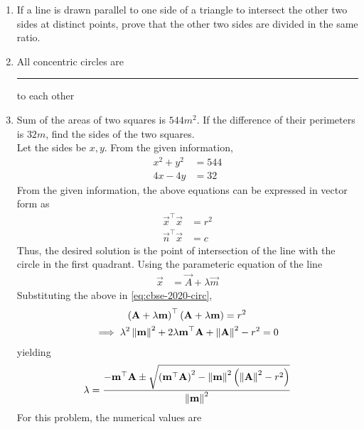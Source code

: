 \documentclass[journal,12pt,twocolumn]{IEEEtran}
\begin{document}
\begin{enumerate}
\begin{figure}[h!]
    	\caption{}
    	\label{Fig6}
     \end{figure}
    \item If a line is drawn parallel to one side of a triangle to intersect the other two sides at distinct points, prove that the other two sides are divided in the same ratio.\\
\item All concentric circles are \rule{1.5cm}{0.15mm} to each other\\
        \item Sum of the areas of two squares is $544 m^2$. If the difference of their perimeters is $32m$, find the sides of the two squares.\\
		\solution Let the sides be $x, y$.  From the given information, 
		    \begin{align}
			    x^2 +y^2 &= 544
			    \\
			    4x - 4y &= 32
		    \end{align}
		    From the given information, the above equations can be expressed in vector form as 
		    \begin{align}
			    \label{eq:cbse-2020-circ}
			    \vec{x}^{\top}\vec{x} &= r^2
			    \\
			    \vec{n}^{\top}\vec{x} &= c
		    \end{align}
		    Thus, the desired solution is the point of intersection of the line with the circle in the first quadrant.  Using the parameteric equation of the line 
		    \begin{align}
			    \label{eq:cbse-2020-circ-line-param}
			    \vec{x} &= \vec{A} + \lambda \vec{m}
		    \end{align}
			    Substituting the above in \eqref{eq:cbse-2020-circ}, 
		    \begin{multline}
			    \left( \mathbf{A} + \lambda \mathbf{m}\right)^{\top}
			    \left( \mathbf{A} + \lambda \mathbf{m}\right)
			    = r^2
			    \\
			    \implies \lambda^2\left\lVert\mathbf{m}\right\rVert^2+ 2 \lambda \mathbf{m}^{\top}\mathbf{A}
			    +\left\lVert\mathbf{A}\right\rVert^2 - r^2 = 0
		    \end{multline}
		    yielding 
		    {\small
		    \begin{align}
			    \label{eq:cbse-2020-circ_lam}
		\lambda = \frac{-\mathbf{m}^{\top}\mathbf{A}\pm \sqrt{\left(\mathbf{m}^{\top}\mathbf{A}\right)^2 -\left\lVert\mathbf{m}\right\rVert^2\left(\left\lVert\mathbf{A}\right\rVert^2 - r^2 \right)}}{\left\lVert\mathbf{m}\right\rVert^2}
		    \end{align}
		    }
		    For this problem, the numerical values are
		    \begin{align}

\end{align}
\end{enumerate}
\end{document}
